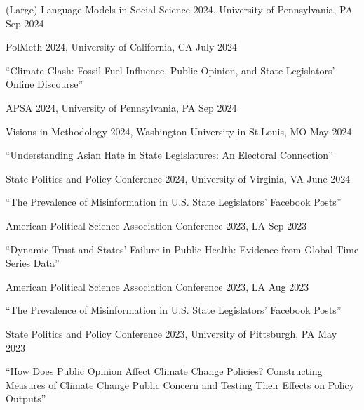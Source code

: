 \documentclass[10.5pt,]{article}
\providecommand{\tightlist}{%
	\setlength{\itemsep}{0pt}\setlength{\parskip}{0pt}}
\renewenvironment{itemize}{
	\begin{list}{}{
			\setlength{\leftmargin}{1.5em}
		}
	}{
	\end{list}
}
\begin{document}
\begin{itemize}
  \begin{itemize}
  \tightlist
  \item
    (Large) Language Models in Social Science 2024, University of
    Pennsylvania, PA \hfill Sep 2024
  \item
    PolMeth 2024, University of California, CA \hfill July 2024
  \end{itemize}
\item
  ``Climate Clash: Fossil Fuel Influence, Public Opinion, and State
  Legislators' Online Discourse''

  \begin{itemize}
  \tightlist
  \item
    APSA 2024, University of Pennsylvania, PA \hfill Sep 2024
  \item
    Visions in Methodology 2024, Washington University in St.Louis, MO
    \hfill May 2024
  \end{itemize}
\item
  ``Understanding Asian Hate in State Legislatures: An Electoral
  Connection''

  \begin{itemize}
  \tightlist
  \item
    State Politics and Policy Conference 2024, University of Virginia,
    VA \hfill June 2024
  \end{itemize}
\item
  ``The Prevalence of Misinformation in U.S. State Legislators' Facebook
  Posts''

  \begin{itemize}
  \tightlist
  \item
    American Political Science Association Conference 2023, LA
    \hfill Sep 2023
  \end{itemize}
\item
  ``Dynamic Trust and States' Failure in Public Health: Evidence from
  Global Time Series Data''

  \begin{itemize}
  \tightlist
  \item
    American Political Science Association Conference 2023, LA
    \hfill Aug 2023
  \end{itemize}
\item
  ``The Prevalence of Misinformation in U.S. State Legislators' Facebook
  Posts''

  \begin{itemize}
  \tightlist
  \item
    State Politics and Policy Conference 2023, University of Pittsburgh,
    PA \hfill May 2023
  \end{itemize}
\item
  ``How Does Public Opinion Affect Climate Change Policies? Constructing
  Measures of Climate Change Public Concern and Testing Their Effects on
  Policy Outputs''


\end{itemize}
\end{document}
